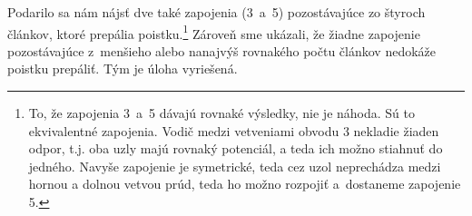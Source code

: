 Podarilo sa nám nájsť dve také zapojenia (3~a~5) pozostávajúce zo
štyroch článkov, ktoré prepália poistku.\footnote{To, že zapojenia 3~a~5 dávajú rovnaké výsledky, nie je náhoda. Sú
to ekvivalentné zapojenia. Vodič medzi vetveniami obvodu 3 nekladie
žiaden odpor, t.j. oba uzly majú rovnaký potenciál, a teda ich možno
stiahnuť do jedného. Navyše zapojenie je symetrické, teda cez uzol
neprechádza medzi hornou a dolnou vetvou prúd, teda ho možno rozpojiť
a~dostaneme zapojenie 5.} Zároveň sme ukázali, že žiadne zapojenie pozostávajúce z~menšieho
alebo nanajvýš rovnakého počtu článkov nedokáže poistku prepáliť.
Tým je úloha vyriešená.

